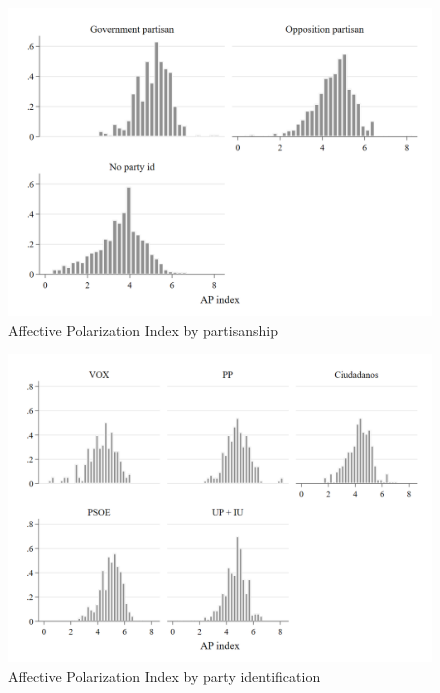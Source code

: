 \documentclass[a4paper, svgnames]{article}
\begin{document}
\begin{figure}[H]
	\centering
	\includegraphics[scale=0.35]{Figures/AP_index_by_partisanship.png}
	\caption{\label{fig:AP_partisan} Affective Polarization Index by partisanship}
\end{figure}


\begin{figure}[H]
	\centering
	\includegraphics[scale=0.35]{Figures/AP_index_by_party_id.png}
	\caption{\label{fig:AP_party_id} Affective Polarization Index by party identification}
\end{figure}
\end{document}
